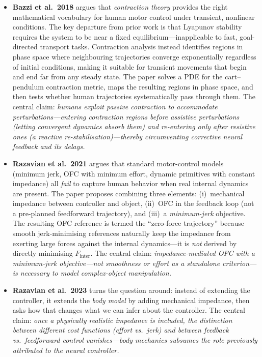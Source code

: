 \documentclass[11pt]{article}
\begin{document}
\begin{itemize}[leftmargin=1.2em]
  \item \textbf{Bazzi et al.\ 2018} argues that \emph{contraction theory} provides the right mathematical vocabulary for human motor control under transient, nonlinear conditions.  The key departure from prior work is that Lyapunov stability requires the system to be near a fixed equilibrium---inapplicable to fast, goal-directed transport tasks.  Contraction analysis instead identifies regions in phase space where neighbouring trajectories converge exponentially regardless of initial conditions, making it suitable for transient movements that begin and end far from any steady state.  The paper solves a PDE for the cart--pendulum contraction metric, maps the resulting regions in phase space, and then tests whether human trajectories systematically pass through them.  The central claim: \textit{humans exploit passive contraction to accommodate perturbations---entering contraction regions \emph{before} assistive perturbations (letting convergent dynamics absorb them) and re-entering only \emph{after} resistive ones (a reactive re-stabilisation)---thereby circumventing corrective neural feedback and its delays.}

  \item \textbf{Razavian et al.\ 2021} argues that standard motor-control models (minimum jerk, OFC with minimum effort, dynamic primitives with constant impedance) all \emph{fail} to capture human behavior when real internal dynamics are present.  The paper proposes combining three elements: (i)~mechanical impedance between controller and object, (ii)~OFC in the feedback loop (not a pre-planned feedforward trajectory), and (iii)~a \emph{minimum-jerk} objective.  The resulting OFC reference is termed the ``zero-force trajectory'' because smooth jerk-minimising references naturally keep the impedance from exerting large forces against the internal dynamics---it is \emph{not} derived by directly minimising $F_{\text{inter}}$.  The central claim: \textit{impedance-mediated OFC with a minimum-jerk objective---not smoothness or effort as a standalone criterion---is necessary to model complex-object manipulation.}

  \item \textbf{Razavian et al.\ 2023} turns the question around: instead of extending the controller, it extends the \emph{body model} by adding mechanical impedance, then asks how that changes what we can infer about the controller.  The central claim: \textit{once a physically realistic impedance is included, the distinction between different cost functions (effort vs.\ jerk) and between feedback vs.\ feedforward control vanishes---body mechanics subsumes the role previously attributed to the neural controller.}
\end{itemize}
\end{document}
